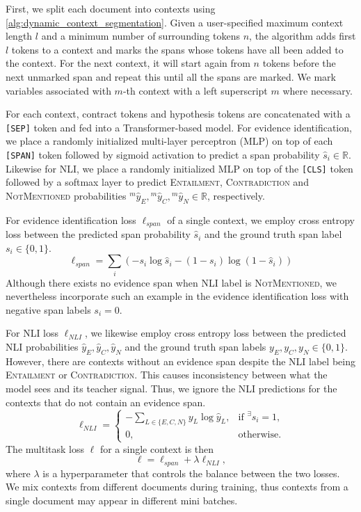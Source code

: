 First, we split each document into contexts using \cref{alg:dynamic_context_segmentation}.
Given a user-specified maximum context length $l$ and a minimum number of surrounding tokens $n$, the algorithm adds first $l$ tokens to a context and marks the spans whose tokens have all been added to the context.
For the next context, it will start again from $n$ tokens before the next unmarked span and repeat this until all the spans are marked.
We mark variables associated with $m$-th context with a left superscript $m$ where necessary.

For each context, contract tokens and hypothesis tokens are concatenated with a \texttt{[SEP]} token and fed into a Transformer-based model.
For evidence identification, we place a randomly initialized multi-layer perceptron (MLP) on top of each \texttt{[SPAN]} token followed by sigmoid activation to predict a span probability $\hat{s}_i  \in \mathbb{R}$.
Likewise for NLI, we place a randomly initialized MLP on top of the \texttt{[CLS]} token followed by a softmax layer to predict \textsc{Entailment},  \textsc{Contradiction} and \textsc{NotMentioned} probabilities ${}^m\hat{y}_E, {}^m\hat{y}_C, {}^m\hat{y}_N \in \mathbb{R}$, respectively.

For evidence identification loss $\ell_{span}$ of a single context, we employ cross entropy loss between the predicted span probability $\hat{s}_i$ and the ground truth span label $s_i \in \{0, 1\}$.
\begin{equation}
    \ell_{span} = \sum_i \left(- s_i \log \hat{s}_i - (1 - s_i) \log (1 - \hat{s}_i )\right)
\end{equation}
Although there exists no evidence span when NLI label is \textsc{NotMentioned}, we nevertheless incorporate such an example in the evidence identification loss with negative span labels $s_i = 0$.

For NLI loss $\ell_{NLI}$, we likewise employ cross entropy loss between the predicted NLI probabilities $\hat{y}_E, \hat{y}_C, \hat{y}_N$ and the ground truth span labels $y_E, y_C, y_N \in \{0, 1\}$.
However, there are contexts without an evidence span despite the NLI label being \textsc{Entailment} or \textsc{Contradiction}.
This causes inconsistency between what the model sees and its teacher signal.
Thus, we ignore the NLI predictions for the contexts that do not contain an evidence span.
\begin{equation}
    \ell_{NLI} = \begin{cases}
        - \sum_{L\in\{E, C ,N\}} y_L \log \hat{y}_L, & \text{if } {}^\exists s_i = 1, \\
        0, & \text{otherwise}.
    \end{cases}
\end{equation}
The multitask loss $\ell$ for a single context is then
\begin{equation}
    \ell = \ell_{span} + \lambda \ell_{NLI},
\end{equation}
where $\lambda$ is a hyperparameter that controls the balance between the two losses.
We mix contexts from different documents during training, thus contexts from a single document may appear in different mini batches.

